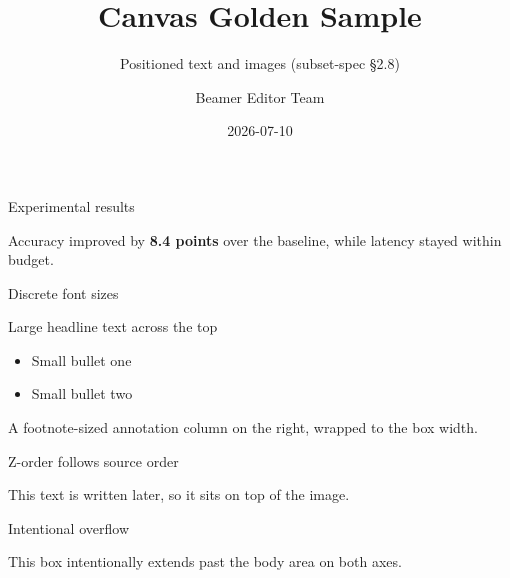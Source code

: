 \documentclass[aspectratio=169]{beamer}
\title{Canvas Golden Sample}
\subtitle{Positioned text and images (subset-spec §2.8)}
\author{Beamer Editor Team}
\date{2026-07-10}
\begin{document}
\begin{frame}
  \titlepage
\end{frame}

\begin{frame}[label=canvas-results]{Experimental results}
  \begin{deckcanvas}
    \begin{decktext}[x=0.050,y=0.100,w=0.420,size=normal]
      Accuracy improved by \textbf{8.4 points} over the baseline, while
      latency stayed within budget.
    \end{decktext}
  \end{deckcanvas}
\end{frame}

\begin{frame}[label=canvas-sizes]{Discrete font sizes}
  \begin{deckcanvas}
    \begin{decktext}[x=0.050,y=0.050,w=0.900,size=Large]
      Large headline text across the top
    \end{decktext}
    \begin{decktext}[x=0.050,y=0.320,w=0.430,size=small]
      \begin{itemize}
        \item Small bullet one
        \item Small bullet two
      \end{itemize}
    \end{decktext}
    \begin{decktext}[x=0.520,y=0.320,w=0.430,size=footnotesize]
      A footnote-sized annotation column on the right, wrapped to the box
      width.
    \end{decktext}
  \end{deckcanvas}
\end{frame}

\begin{frame}[label=canvas-stack]{Z-order follows source order}
  \begin{deckcanvas}
    \begin{decktext}[x=0.300,y=0.450,w=0.400,size=normal]
      This text is written later, so it sits on top of the image.
    \end{decktext}
  \end{deckcanvas}
\end{frame}

\begin{frame}[label=canvas-overflow]{Intentional overflow}
  \begin{deckcanvas}
    \begin{decktext}[x=0.800,y=0.900,w=0.400,size=normal]
      This box intentionally extends past the body area on both axes.
    \end{decktext}
  \end{deckcanvas}
\end{frame}
\end{document}
